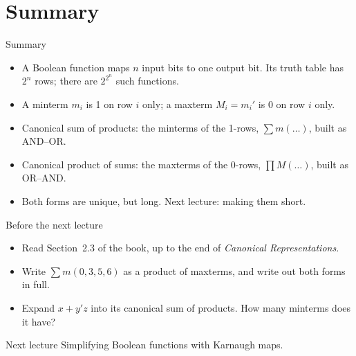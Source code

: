 \documentclass[10pt]{wosm-slides}
\begin{document}
\section{Summary}

\begin{frame}{Summary}
  \begin{itemize}
    \item A Boolean function maps $n$ input bits to one output bit. Its truth table
      has $2^n$ rows; there are $2^{2^n}$ such functions.
    \item A minterm $m_i$ is 1 on row $i$ only; a maxterm $M_i = m_i'$ is 0 on row
      $i$ only.
    \item Canonical sum of products: the minterms of the 1-rows, $\sum m(\dots)$,
      built as AND--OR.
    \item Canonical product of sums: the maxterms of the 0-rows, $\prod M(\dots)$,
      built as OR--AND.
    \item Both forms are unique, but long. Next lecture: making them short.
  \end{itemize}
\end{frame}

\begin{frame}{Before the next lecture}
  \begin{itemize}
    \item Read Section~2.3 of the book, up to the end of \emph{Canonical
      Representations}.
    \item Write $\sum m(0, 3, 5, 6)$ as a product of maxterms, and write out both
      forms in full.
    \item Expand $x + y'z$ into its canonical sum of products. How many minterms
      does it have?
  \end{itemize}

  \begin{block}{Next lecture }
    Simplifying Boolean functions with Karnaugh maps.
  \end{block}
\end{frame}
\end{document}
